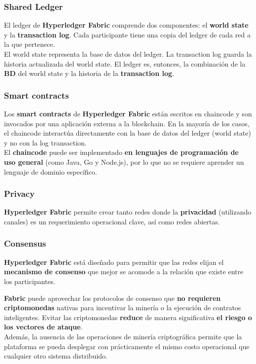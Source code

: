 \documentclass{beamer}
\begin{document}
	\begin{frame}
		\frametitle{Shared Ledger}
		El ledger de \textbf{Hyperledger Fabric} comprende dos componentes: el \textbf{world state} y la \textbf{transaction log}. Cada participante tiene una copia del ledger de cada red a la que pertenece.\\
		\vspace{4mm}
		El world state representa la base de datos del ledger. La transaction log guarda la historia actualizada del world state. El ledger es, entonces, la combinación de la \textbf{BD} del world state y la historia de la \textbf{transaction log}.
	\end{frame}
	
	\begin{frame}
		\frametitle{Smart contracts}
		Los \textbf{smart contracts} de \textbf{Hyperledger Fabric} están escritos en chaincode y son invocados por una aplicación externa a la blockchain. En la mayoría de los casos, el chaincode interactúa directamente con la base de datos del ledger (world state) y no con la log transaction.\\
		\vspace{4mm}
		El \textbf{chaincode} puede ser implementado \textbf{en lenguajes de programación de uso general} (como Java, Go y Node.js), por lo que no se requiere aprender un lenguaje de dominio específico.\\
	\end{frame}

	\begin{frame}
		\frametitle{Privacy}
		\textbf{Hyperledger Fabric} permite crear tanto redes donde la \textbf{privacidad} (utilizando canales) es un requerimiento operacional clave, así como redes abiertas.
	\end{frame}
	
	\begin{frame}
		\frametitle{Consensus}
		\textbf{Hyperledger Fabric} está diseñado para permitir que las redes elijan el \textbf{mecanismo de consenso} que mejor se acomode a la relación que existe entre los participantes.
	\end{frame}
		
	\begin{frame}
		\textbf{Fabric} puede aprovechar los protocolos de consenso que \textbf{no requieren criptomonedas} nativas para incentivar la minería o la ejecución de contratos inteligentes. Evitar las criptomonedas \textbf{reduce} de manera significativa \textbf{el riesgo o los vectores de ataque}.\\
		\vspace{4mm}
		Además, la ausencia de las operaciones de minería criptográfica permite que la plataforma se pueda desplegar con prácticamente el mismo costo operacional que cualquier otro sistema distribuido. 
	\end{frame}
\end{document}
